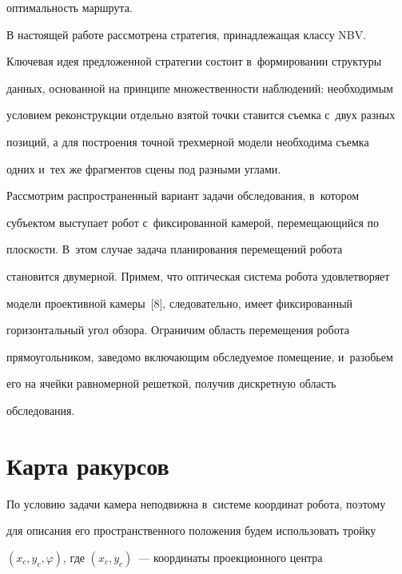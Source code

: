 оптимальность маршрута.

  

  В настоящей работе рассмотрена стратегия, принадлежащая классу NBV. 

Ключевая идея предложенной стратегии состоит в~формировании структуры 

данных, основанной на принципе множественности наблюдений: необходимым 

условием реконструкции отдельно взятой точки ставится съемка с~двух разных 

позиций, а для построения точной трехмерной модели необходима съемка 

одних и~тех же фрагментов сцены под разными углами.

  

  Рассмотрим распространенный вариант задачи обследования, в~котором 

субъектом выступает робот с~фиксированной камерой, перемещающийся по 

плоскости. В~этом случае задача планирования перемещений робота 

становится двумерной. Примем, что оптическая система робота удовлетворяет 

модели проективной камеры~[8], следовательно, имеет фиксированный 

горизонтальный угол обзора. Ограничим область перемещения робота 

прямоугольником, заведомо вклю\-ча\-ющим обследуемое помещение, и~разобьем 

его на ячейки равномерной решеткой, получив дискретную область 

обследования.



\vspace*{-3pt}

  

  \section{Карта ракурсов}

  

  \vspace*{-3pt}

  

  По условию задачи камера неподвижна в~системе координат робота, поэтому 

для описания его пространственного положения будем использовать тройку 

  $(x_c, y_c, \varphi)$, где $(x_c, y_c)$~--- координаты проекционного центра 

